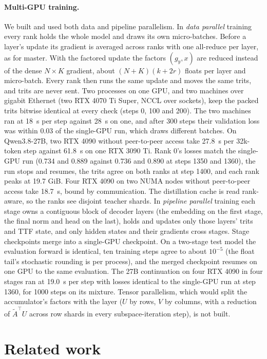 \documentclass[10pt,twocolumn]{article}
\begin{document}
\paragraph{Multi-GPU training.} We built and used both data and pipeline parallelism. In \emph{data parallel} training
every rank holds the whole model and draws its own micro-batches. Before a layer's update its gradient is averaged
across ranks with one all-reduce per layer, as for master. With the factored update the factors $(g_y, x)$ are reduced
instead of the dense $N\times K$ gradient, about $(N+K)(k+2r)$ floats per layer and micro-batch. Every rank then runs
the same update and moves the same trits, and trits are never sent. Two processes on one GPU, and two machines over
gigabit Ethernet (two RTX 4070 Ti Super, NCCL over sockets), keep the packed trits bitwise identical at every check
(steps 0, 100 and 200). The two machines ran at 18~s per step against 28~s on one, and after 300 steps their validation
loss was within 0.03 of the single-GPU run, which draws different batches. On Qwen3.8-27B, two RTX 4090 without
peer-to-peer access take 27.8~s per 32k-token step against 61.8~s on one RTX 3090 Ti. Rank 0's losses match the
single-GPU run (0.734 and 0.889 against 0.736 and 0.890 at steps 1350 and 1360), the run stops and resumes, the trits
agree on both ranks at step 1400, and each rank peaks at 19.7 GiB. Four RTX 4090 on two NUMA nodes without peer-to-peer
access take 18.7~s, bound by communication. The distillation cache is read rank-aware, so the ranks see disjoint
teacher shards. In \emph{pipeline parallel} training each stage owns a contiguous block of decoder layers (the embedding on the first stage, the
final norm and head on the last), holds and updates only those layers' trits and TTF state, and only hidden states and
their gradients cross stages. Stage checkpoints merge into a single-GPU checkpoint. On a two-stage test model the
evaluation forward is identical, ten training steps agree to about $10^{-5}$ (the float tail's stochastic rounding is
per process), and the merged checkpoint resumes on one GPU to the same evaluation. The 27B continuation on four RTX
4090 in four stages ran at 19.0~s per step with losses identical to the single-GPU run at step 1360, for 1000 steps on
its mixture. Tensor parallelism, which would split the accumulator's factors with the layer ($U$ by rows, $V$ by
columns, with a reduction of $\tilde A^\top U$ across row shards in every subspace-iteration step), is not built.

\section{Related work}\label{sec:related}
\end{document}
